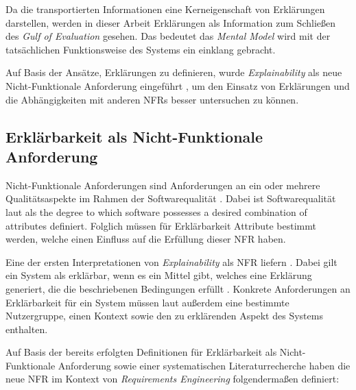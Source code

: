 Da die transportierten Informationen eine Kerneigenschaft von Erklärungen darstellen, werden in dieser Arbeit Erklärungen als Information zum Schließen des \textit{Gulf of Evaluation} \cite{norman1988psychology} gesehen. Das bedeutet das \textit{Mental Model} wird mit der tatsächlichen Funktionsweise des Systems ein einklang gebracht.

Auf Basis der Ansätze, Erklärungen zu definieren, wurde \textit{Explainability} als neue Nicht-Funktionale Anforderung eingeführt \cite{kohl_explainability_2019}, um den Einsatz von Erklärungen und die Abhängigkeiten mit anderen NFRs besser untersuchen zu können.

\subsection{Erklärbarkeit als Nicht-Funktionale Anforderung}
\label{02_basics:explainability}

Nicht-Funktionale Anforderungen sind Anforderungen an ein oder mehrere Qualitätsaspekte im Rahmen der Softwarequalität \cite{chung2009non,schneider2012abenteuer}. Dabei ist Softwarequalität laut  als \glqq [...] the degree to which software possesses a desired combination of attributes\grqq{}\cite{international1992ieee} definiert. Folglich müssen für Erklärbarkeit Attribute bestimmt werden, welche einen Einfluss auf die Erfüllung dieser NFR haben.

Eine der ersten Interpretationen von \textit{Explainability} als NFR liefern \citeauthor{kohl_explainability_2019}. Dabei gilt ein System als erklärbar, wenn es ein Mittel gibt, welches eine Erklärung generiert, die die beschriebenen Bedingungen erfüllt \cite{kohl_explainability_2019}. Konkrete Anforderungen an Erklärbarkeit für ein System müssen laut \citeauthor{kohl_explainability_2019} außerdem eine bestimmte Nutzergruppe, einen Kontext sowie den zu erklärenden Aspekt des Systems enthalten.

Auf Basis der bereits erfolgten Definitionen für Erklärbarkeit als Nicht-Funktionale Anforderung sowie einer systematischen Literaturrecherche haben \citeauthor{chazette_knowledge_nodate} die neue NFR im Kontext von \textit{Requirements Engineering} folgendermaßen definiert:

\smallskip

\noindent{}

